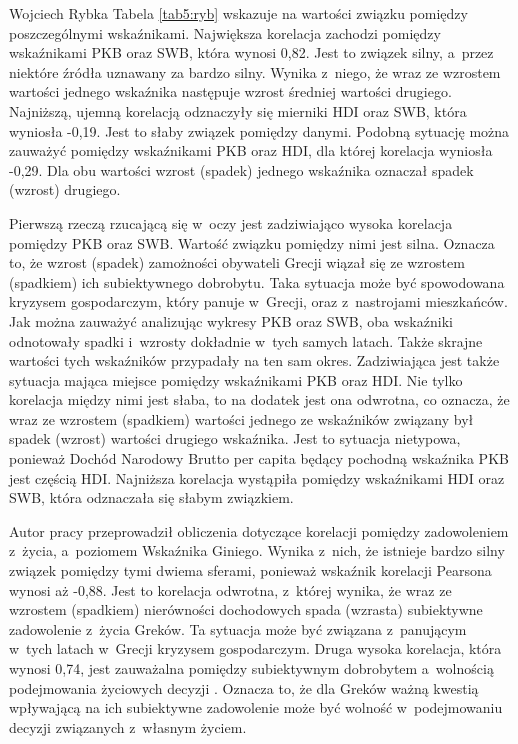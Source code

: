 \begin{artplenv}{Wojciech Rybka}
Tabela \ref{tab5:ryb} wskazuje na wartości związku pomiędzy poszczególnymi wskaźnikami. Największa korelacja zachodzi pomiędzy
wskaźnikami PKB oraz SWB, która wynosi 0,82. Jest to związek silny, a~przez niektóre źródła uznawany za bardzo silny.
Wynika z~niego, że wraz ze wzrostem wartości jednego wskaźnika następuje wzrost średniej wartości drugiego. Najniższą,
ujemną korelacją odznaczyły się mierniki HDI oraz SWB, która wyniosła -0,19. Jest to słaby związek pomiędzy danymi.
Podobną sytuację można zauważyć pomiędzy wskaźnikami PKB oraz HDI, dla której korelacja wyniosła -0,29. Dla obu
wartości wzrost (spadek) jednego wskaźnika oznaczał spadek (wzrost) drugiego. 

Pierwszą rzeczą rzucającą się w~oczy jest zadziwiająco wysoka korelacja pomiędzy PKB oraz SWB. Wartość
związku pomiędzy nimi jest silna. Oznacza to, że wzrost (spadek) zamożności obywateli
Grecji wiązał się ze wzrostem (spadkiem) ich subiektywnego dobrobytu. Taka sytuacja może być spowodowana kryzysem
gospodarczym, który panuje w~Grecji, oraz z~nastrojami mieszkańców. Jak można zauważyć analizując wykresy PKB oraz SWB,
oba wskaźniki odnotowały spadki i~wzrosty dokładnie w~tych samych latach. Także skrajne wartości tych wskaźników
przypadały na ten sam okres. Zadziwiająca jest także sytuacja mająca miejsce pomiędzy wskaźnikami PKB oraz HDI. Nie
tylko korelacja między nimi jest słaba, to na dodatek jest ona odwrotna, co oznacza, że wraz ze wzrostem (spadkiem)
wartości jednego ze wskaźników związany był spadek (wzrost) wartości drugiego wskaźnika. Jest to sytuacja nietypowa,
ponieważ Dochód Narodowy Brutto per capita będący pochodną wskaźnika PKB jest częścią HDI. Najniższa korelacja
wystąpiła pomiędzy wskaźnikami HDI oraz SWB, która odznaczała się słabym związkiem. 

Autor pracy przeprowadził obliczenia dotyczące korelacji pomiędzy zadowoleniem z~życia, a~poziomem Wskaźnika Giniego.
Wynika z~nich, że istnieje bardzo silny związek pomiędzy tymi dwiema sferami, ponieważ wskaźnik korelacji Pearsona
wynosi aż -0,88. Jest to korelacja odwrotna, z~której wynika, że wraz ze wzrostem (spadkiem) nierówności dochodowych
spada (wzrasta) subiektywne zadowolenie z~życia Greków. Ta sytuacja może być związana z~panującym w~tych
latach w~Grecji kryzysem gospodarczym. Druga wysoka korelacja, która wynosi 0,74, jest zauważalna pomiędzy subiektywnym
dobrobytem a~wolnością podejmowania życiowych decyzji
\parencite{noauthor_world_2018}.
Oznacza
to, że dla Greków ważną kwestią wpływającą na ich subiektywne zadowolenie może być wolność w~podejmowaniu decyzji
związanych z~własnym życiem.


\end{artplenv}
